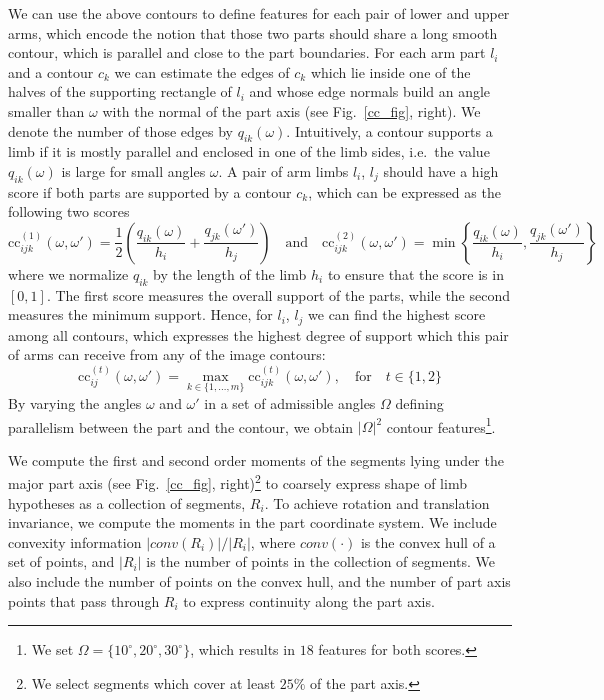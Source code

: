 We can use the above contours to define features for each pair of lower and upper arms, which encode the notion that those two parts should share a long smooth contour, which is parallel and close to the part boundaries. For each arm part $l_i$ and a contour $c_k$ we can estimate the edges of $c_k$ which lie inside one of the halves of the supporting rectangle of $l_i$ and whose edge normals build an angle smaller than $\omega$ with the normal of the part axis (see Fig.~\ref{cc_fig}, right). We denote the number of those edges by $q_{ik}(\omega)$. Intuitively, a contour supports a limb if it is mostly parallel and enclosed in one of the limb sides, i.e.~the value $q_{ik}(\omega)$ is large for small angles $\omega$. A pair of arm limbs $l_i$, $l_j$ should have a high score if both parts are supported by a contour $c_k$, which can be expressed as the following two scores
\[
  \textrm{cc}_{ijk}^{(1)}(\omega, \omega') = \frac{1}{2}\left(\frac{q_{ik}(\omega)}{h_i} + \frac{q_{jk}(\omega')}{h_j}\right)\quad\textrm{and}\quad\textrm{cc}_{ijk}^{(2)}(\omega, \omega') = \min\left\{\frac{q_{ik}(\omega)}{h_i}, \frac{q_{jk}(\omega')}{h_j}\right\}
\]
where we normalize $q_{ik}$ by the length of the limb $h_i$ to ensure that the score is in $[0,1]$. The first score measures the overall support of the parts, while the second measures the minimum support. Hence, for $l_i$, $l_j$ we can find the highest score among all contours, which expresses the highest degree of support which this pair of arms can receive from any of the image contours:
\[
\textrm{cc}_{ij}^{(t)}(\omega, \omega') = \max_{k\in\{1, \dots , m\}}\textrm{cc}_{ijk}^{(t)}(\omega, \omega'), \quad\textrm{for} \quad t\in\{1,2\}
\]
By varying the angles $\omega$ and $\omega'$ in a set of admissible angles $\Omega$ defining parallelism between the part and the contour, we obtain $|\Omega|^2$ contour features\footnote{We set $\Omega=\{10^\circ, 20^\circ, 30^\circ\}$, which results in $18$ features for both scores.}.

 We compute the first and second order moments of 
the segments lying under the major part axis (see Fig.~\ref{cc_fig}, 
right)\footnote{We select segments which cover at least $25\%$ of the part 
axis.} to coarsely express shape of limb hypotheses as a collection of 
segments, $R_i$. To achieve rotation and translation invariance, we compute the 
moments in the part coordinate system.  We include convexity information 
$|conv(R_{i})|/|R_{i}|$, where $conv(\cdot)$ is the convex hull of a set of 
points, and $|R_{i}|$ is the number of points in the collection of segments.  
We also include the number of points on the convex hull, and the number of part 
axis points that pass through $R_{i}$ to express continuity along the part 
axis. 
 

